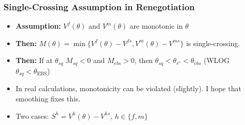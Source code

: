 \documentclass[aspectratio=169]{beamer}
\let\olditem\item
\renewcommand{\item}{%
\olditem\vspace{\fill}}
\begin{document}
\begin{frame}
\frametitle{Single-Crossing Assumption in Renegotiation}
\begin{itemize}
\item \textbf{Assumption:} $V^f(\theta)$ and $V^m(\theta)$ are monotonic in $\theta$
\item \textbf{Then:} $M(\theta) = \min \{ V^f(\theta) - V^{fs}, V^m(\theta) - V^{ms} \}$ is single-crossing.
\item \textbf{Then:} If at $\theta_{sq}$ $M_{sq} < 0$ and $M_{ebs} > 0$, then $\theta_{sq} < \theta_{r^*}  < \theta_{ebs}$ (WLOG $\theta_{sq} < \theta_{\text{EBS}}$)
\item In real calculations, monotonicity can be violated (slightly). I hope that smoothing fixes this.
\item Two cases: $S^h = V^h(\theta) - V^{hs}$, $h \in \{f,m\}$
\end{itemize}


\end{frame}
\end{document}
